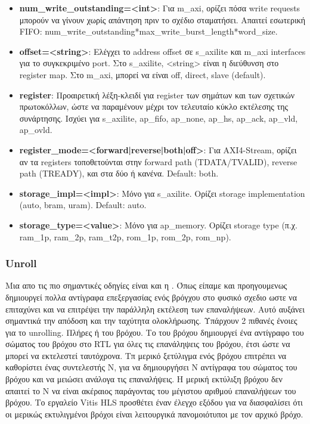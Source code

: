\begin{itemize}
  \item \textbf{num\_write\_outstanding=<int>}: Για m\_axi, ορίζει πόσα write requests μπορούν να γίνουν χωρίς απάντηση πριν το σχέδιο σταματήσει. Απαιτεί εσωτερική FIFO: num\_write\_outstanding*max\_write\_burst\_length*word\_size.
  \item \textbf{offset=<string>}: Ελέγχει το address offset σε s\_axilite και m\_axi interfaces για το συγκεκριμένο port. Στο s\_axilite, <string> είναι η διεύθυνση στο register map. Στο m\_axi, μπορεί να είναι off, direct, slave (default).
  \item \textbf{register}: Προαιρετική λέξη-κλειδί για register των σημάτων και των σχετικών πρωτοκόλλων, ώστε να παραμένουν μέχρι τον τελευταίο κύκλο εκτέλεσης της συνάρτησης. Ισχύει για s\_axilite, ap\_fifo, ap\_none, ap\_hs, ap\_ack, ap\_vld, ap\_ovld.
  \item \textbf{register\_mode=<forward|reverse|both|off>}: Για AXI4-Stream, ορίζει αν τα registers τοποθετούνται στην forward path (TDATA/TVALID), reverse path (TREADY), και στα δύο ή κανένα. Default: both.
  \item \textbf{storage\_impl=<impl>}: Μόνο για s\_axilite. Ορίζει storage implementation (auto, bram, uram). Default: auto.
  \item \textbf{storage\_type=<value>}: Μόνο για ap\_memory. Ορίζει storage type (π.χ. ram\_1p, ram\_2p, ram\_t2p, rom\_1p, rom\_2p, rom\_np).
\end{itemize}

\subsubsection{Unroll}
Μια απο τις πιο σημαντικές οδηγίες είναι και η . Όπως είπαμε και προηγουμενως δημιουργεί πολλα αντίγραφα επεξεργασίας ενός βρόγχου στο φυσικό σχεδιο
ωστε να επιταχύνει και να επιτρέψει την παράλληλη εκτέλεση των επαναλήψεων. Αυτό αυξάνει σημαντικά την απόδοση και την ταχύτητα ολοκλήρωσης. Υπάρχουν 2 πιθανές 
ένοιες για το unrolling. Πλήρες ή  του βρόχου. Το  του βρόχου δημιουργεί ένα αντίγραφο του σώματος του βρόχου στο RTL για όλες τις επανάληψεις
του βρόχου, έτσι ώστε  να μπορεί να εκτελεστεί ταυτόχρονα. 
Τπ μερικό ξετύλιγμα ενός βρόχου επιτρέπει να καθορίστει ένας συντελεστής N, για να δημιουργήσει N αντίγραφα του σώματος του βρόχου και να μειώσει ανάλογα τις επαναλήψεις.
Η μερική εκτύλιξη βρόχου δεν απαιτεί το N να είναι ακέραιος παράγοντας του μέγιστου αριθμού επαναλήψεων του βρόχου.
Το εργαλείο Vitis HLS προσθέτει έναν έλεγχο εξόδου για να διασφαλίσει ότι οι μερικώς εκτυλιγμένοι βρόχοι είναι λειτουργικά πανομοιότυποι με τον αρχικό βρόχο.


